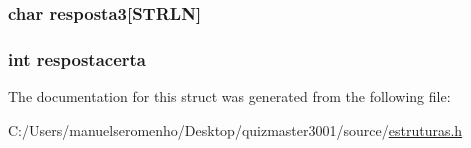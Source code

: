 \hypertarget{structperguntas__rand_a6489103c53562db7f0f8e86d47fe3b79}{
\subsubsection[{resposta3}]{\setlength{\rightskip}{0pt plus 5cm}char resposta3\mbox{[}{\bf S\+T\+R\+L\+N}\mbox{]}}}\label{structperguntas__rand_a6489103c53562db7f0f8e86d47fe3b79}
\hypertarget{structperguntas__rand_a3e23bda5c00103b6d418157ef2743768}{
\subsubsection[{respostacerta}]{\setlength{\rightskip}{0pt plus 5cm}int respostacerta}}\label{structperguntas__rand_a3e23bda5c00103b6d418157ef2743768}


The documentation for this struct was generated from the following file\+:\begin{DoxyCompactItemize}
\item 
C\+:/\+Users/manuelseromenho/\+Desktop/quizmaster3001/source/\hyperlink{estruturas_8h}{estruturas.\+h}\end{DoxyCompactItemize}
